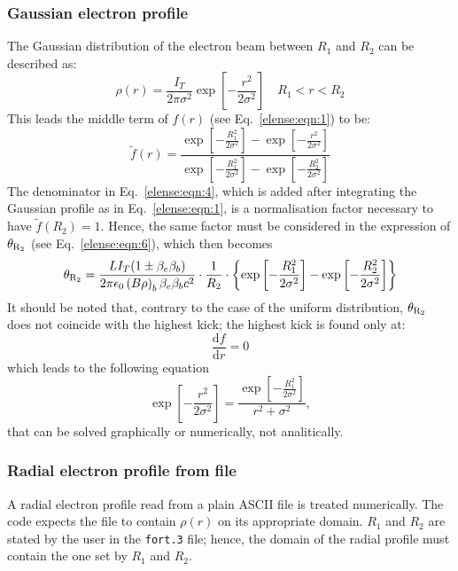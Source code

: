 \documentclass[english]{article}
\begin{document}
\subsubsection{Gaussian electron profile}
The Gaussian distribution of the electron beam between $R_1$ and $R_2$
can be described as:
\begin{equation}
\rho(r) = \frac{I_T}{2\pi\sigma^2} \exp\left[-\frac{r^2}{2\sigma^2}\right] \quad R_1 < r < R_2
\end{equation}
This leads the middle term of $f(r)$ (see Eq.~\ref{elense:eqn:1}) to be:
\begin{equation}
  \tilde f(r)=\frac{\exp\left[-\frac{R_1^2}{2\sigma^2}\right]-\exp\left[-\frac{r^2}{2\sigma^2}\right]}
                   {\exp\left[-\frac{R_1^2}{2\sigma^2}\right]-\exp\left[-\frac{R_2^2}{2\sigma^2}\right]}
  \label{elense:eqn:4}
\end{equation}
The denominator in Eq.~\ref{elense:eqn:4}, which is added after integrating
the Gaussian profile as in Eq.~\ref{elense:eqn:1}, is a normalisation factor
necessary to have $\tilde f(R_2)=1$. Hence, the same factor must be considered
in the expression of $\theta_{\rm R_2}$ (see Eq.~\ref{elense:eqn:6}), which then becomes
\begin{equation}
  \theta_{\rm R_2} = \frac{LI_T(1\pm\beta_e\beta_b)}{2\pi\epsilon_0  \left(B\rho\right)_b\beta_e\beta_b c^2}\cdot\frac{1}{R_2}
  \cdot\left\{\exp\left[-\frac{R_1^2}{2\sigma^2}\right]-\exp\left[-\frac{R_2^2}{2\sigma^2}\right]\right\}
\end{equation}
It should be noted that, contrary to the case of the uniform distribution,
$\theta_{\rm R_2}$ does not coincide with the highest kick; the highest kick is
found only at:
\begin{equation}
  \frac{\textrm{d}f}{\textrm{d}r}=0
\end{equation}
which leads to the following equation
\begin{equation}
  \exp\left[-\frac{r^2}{2\sigma^2}\right] = \frac{\exp\left[-\frac{R_1^2}{2\sigma^2}\right]}{r^2+\sigma^2},
\end{equation}
that can be solved graphically or numerically, not analitically.

\subsubsection{Radial electron profile from file}
A radial electron profile read from a plain ASCII file is treated numerically.
The code expects the file to contain $\rho(r)$ on its appropriate domain.
$R_1$ and $R_2$ are stated by the user in the \texttt{fort.3} file; hence,
the domain of the radial profile must contain the one set by $R_1$ and $R_2$.
\end{document}

